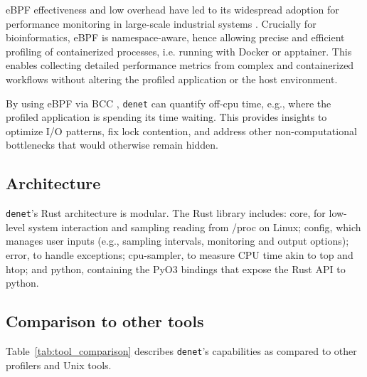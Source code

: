 \documentclass[10pt]{article}
\begin{document}
eBPF effectiveness and low overhead have led to its widespread adoption for performance monitoring in large-scale industrial systems \cite{benson2024netedit}. Crucially for bioinformatics, eBPF is namespace-aware, hence allowing precise and efficient profiling of containerized processes, i.e. running with Docker or apptainer. This enables collecting detailed performance metrics from complex and containerized workflows without altering the profiled application or the host environment.

By using eBPF via BCC \cite{bcc}, \texttt{denet} can quantify off-cpu time, e.g., where the profiled application is spending its time waiting. This provides insights to optimize I/O patterns, fix lock contention, and address other non-computational bottlenecks that would otherwise remain hidden.

\subsection*{Architecture}

\texttt{denet}'s Rust architecture is modular. The Rust library includes: core, for low-level system interaction and sampling reading from /proc on Linux; config, which manages user inputs (e.g., sampling intervals, monitoring and output options); error, to handle exceptions; cpu-sampler, to measure CPU time akin to top and htop; and python, containing the PyO3 bindings that expose the Rust API to python.


\subsection*{Comparison to other tools}


Table~\ref{tab:tool_comparison} describes \texttt{denet}'s capabilities as compared to other profilers and Unix tools.
\end{document}
